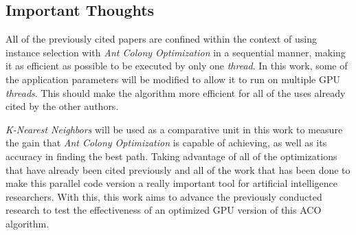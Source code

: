 \subsection{Important Thoughts}

All of the previously cited papers are confined within the context of using instance selection with \emph{Ant Colony Optimization} in a sequential manner, making it as efficient as possible to be executed by only one \emph{thread}. In this work, some of the application parameters will be modified to allow it to run on multiple GPU \emph{threads}. This should make the algorithm more efficient for all of the uses already cited by the other authors.

\emph{K-Nearest Neighbors} will be used as a comparative unit in this work to measure the gain that \emph{Ant Colony Optimization} is capable of achieving, as well as its accuracy in finding the best path. Taking advantage of all of the optimizations that have already been cited previously and all of the work that has been done to make this parallel code version a really important tool for artificial intelligence researchers. With this, this work aims to advance the previously conducted research to test the effectiveness of an optimized GPU version of this ACO algorithm.

